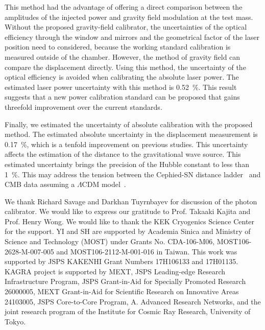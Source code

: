 \documentclass[%
 reprint,
superscriptaddress,
 amsmath,amssymb,
 aps,
]{revtex4-1}
\begin{document}
This method had the advantage of offering a direct comparison between the amplitudes of the injected power and gravity field modulation at the test mass. Without the proposed gravity-field calibrator, the uncertainties of the optical efficiency through the window and mirrors and the geometrical factor of the laser position need to considered, because the working standard calibration is measured outside of the chamber. However, the method of gravity field can compare the displacement directly. Using this method, the uncertainty of the optical efficiency is avoided when calibrating the absolute laser power. The estimated laser power uncertainty with this method is 0.52~\%. This result suggests that a new power calibration standard can be proposed that gains threefold improvement over the current standards.

Finally, we estimated the uncertainty of absolute calibration with the proposed method. The estimated absolute uncertainty in the displacement measurement is 0.17~\%, which is a tenfold improvement on previous studies. This uncertainty affects the estimation of the distance to the gravitational wave source. This estimated uncertainty brings the precision of the Hubble constant to less than 1~\%. This may address the tension between the Cephied-SN distance ladder~\cite{Riess_2016} and CMB data assuming a $\Lambda$CDM 
model~\cite{2016-planck}.

\acknowledgments     %
 
We thank Richard Savage and Darkhan Tuyrnbayev for discussion of the photon calibrator. We would like to express our gratitude to Prof. Takaaki Kajita and Prof. Henry Wong. We would like to thank the KEK Cryogenics Science Center for the support. YI and SH are supported by Academia Sinica and Ministry of Science and Technology (MOST) under Grants No. CDA-106-M06, MOST106-2628-M-007-005 and MOST106-2112-M-001-016 in Taiwan. This work was supported by JSPS KAKENHI Grant Numbers 17H106133 and 17H01135. KAGRA project is supported by MEXT, JSPS Leading-edge Research Infrastructure Program, JSPS Grant-in-Aid for Specially Promoted Research 26000005, MEXT Grant-in-Aid for Scientific Research on Innovative Areas 24103005, JSPS Core-to-Core Program, A. Advanced Research Networks, and the joint research program of the Institute for Cosmic Ray Research, University of Tokyo.


\end{document}

